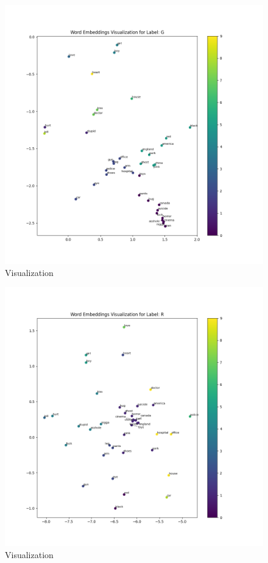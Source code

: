 \documentclass[a4paper]{article}
\begin{document}
\begin{figure}[ht]
    \centering
    \includegraphics[width=1\textwidth]{../stats/word_embeddings_G.png}
    \caption{Visualization}
\end{figure}

\begin{figure}[ht]
    \centering
    \includegraphics[width=1\textwidth]{../stats/word_embeddings_R.png}
    \caption{Visualization}
\end{figure}
\end{document}
